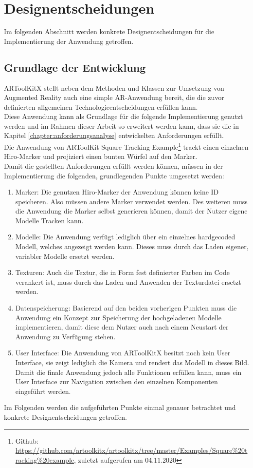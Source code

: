 \section{Designentscheidungen}
Im folgenden Abschnitt werden konkrete Designentscheidungen für die Implementierung der Anwendung getroffen.

\subsection{Grundlage der Entwicklung}
ARToolKitX stellt neben dem Methoden und Klassen zur Umsetzung von Augmented Reality auch eine simple AR-Anwendung bereit, die die zuvor definierten allgemeinen Technologieentscheidungen erfüllen kann.\\
Diese Anwendung kann als Grundlage für die folgende Implementierung genutzt werden und im Rahmen dieser Arbeit so erweitert werden kann, dass sie die in Kapitel \ref{chapter:anforderungsanalyse} entwickelten Anforderungen erfüllt.\\ 
Die Anwendung von ARToolKit \glqq Square Tracking Example\grqq{}\footnote{Github: \url{https://github.com/artoolkitx/artoolkitx/tree/master/Examples/Square\%20tracking\%20example}, zuletzt aufgerufen am 04.11.2020} trackt einen einzelnen Hiro-Marker und projiziert einen bunten Würfel auf den Marker. \\
Damit die gestellten Anforderungen erfüllt werden können, müssen in der Implementierung die folgenden, grundlegenden Punkte umgesetzt werden:
\begin{enumerate}
\item Marker: Die genutzen Hiro-Marker der Anwendung können keine ID speicheren. Also müssen andere Marker verwendet werden. Des weiteren muss die Anwendung die Marker selbst generieren können, damit der Nutzer eigene Modelle Tracken kann.

\item Modelle: Die Anwendung verfügt lediglich über ein einzelnes hardgecoded Modell, welches angezeigt werden kann. Dieses muss durch das Laden eigener, variabler Modelle ersetzt werden.

\item Texturen:  Auch die Textur, die in Form fest definierter Farben im Code verankert ist, muss durch das Laden und Anwenden der Texturdatei ersetzt werden.

\item Datenspeicherung: Basierend auf den beiden vorherigen Punkten muss die Anwendung ein Konzept zur Speicherung der hochgeladenen Modelle implementieren, damit diese dem Nutzer auch nach einem Neustart der Anwendung zu Verfügung stehen.

\item User Interface: Die Anwendung von ARToolKitX besitzt noch kein User Interface, sie zeigt lediglich die Kamera und rendert das Modell in dieses Bild. Damit die finale Anwendung jedoch alle Funktionen erfüllen kann, muss ein User Interface zur Navigation zwischen den einzelnen Komponenten eingeführt werden.
\end{enumerate}
Im Folgenden werden die aufgeführten Punkte einmal genauer betrachtet und konkrete Designentscheidungen getroffen.

